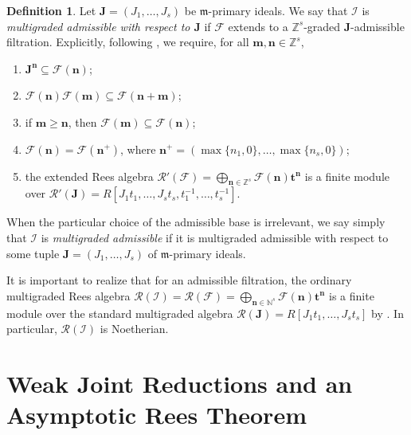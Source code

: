 \documentclass[reqno,12pt]{amsart}
\theoremstyle{plain}
\theoremstyle{definition}
\newtheorem{defn}[prop]{Definition}
\theoremstyle{remark}
\newcommand{\N}{\mathbb N}
\newcommand{\Z}{\mathbb Z}
\numberwithin{equation}{section}
\begin{document}
\begin{defn}
\label{def:admissible}
Let $\mathbf J=(J_1,\ldots,J_s)$ be $\mathfrak m$-primary ideals. We
say that $\boldsymbol{\mathcal I}$ is \emph{multigraded admissible with
respect to $\mathbf J$} if $\mathcal F$ extends to a
$\Z^s$-graded $\mathbf J$-admissible filtration. Explicitly, following
\cite[Definitions~1.3 and 1.4]{SarkarVerma}, we require, for all
$\mathbf m,\mathbf n\in\Z^s$,
\begin{enumerate}
\item $\mathbf J^{\mathbf n}\subseteq\mathcal F(\mathbf n)$;
\item $\mathcal F(\mathbf n)\mathcal F(\mathbf m)
      \subseteq\mathcal F(\mathbf n+\mathbf m)$;
\item if $\mathbf m\geq\mathbf n$, then
      $\mathcal F(\mathbf m)\subseteq\mathcal F(\mathbf n)$;
\item $\mathcal F(\mathbf n)=\mathcal F(\mathbf n^+)$, where
      $\mathbf n^+=(\max\{n_1,0\},\ldots,\max\{n_s,0\})$;
\item the extended Rees algebra $\mathcal R'(\mathcal F)
=
\bigoplus_{\mathbf n\in\Z^s}\mathcal F(\mathbf n)\mathbf t^{\mathbf n}$
is a finite module over
$\mathcal R'(\mathbf J)
=R[J_1t_1,\ldots,J_st_s,t_1^{-1},\ldots,t_s^{-1}]$.
\end{enumerate}
When the particular choice of the admissible base is irrelevant, we say
simply that $\boldsymbol{\mathcal I}$ is \emph{multigraded admissible}
if it is multigraded admissible with respect to some tuple
$\mathbf J=(J_1,\ldots,J_s)$ of $\mathfrak m$-primary ideals.
\end{defn}

It is important to realize that for an admissible filtration, the ordinary multigraded Rees algebra $\mathcal R(\boldsymbol{\mathcal I})
=
\mathcal R(\mathcal F)
=
\bigoplus_{\mathbf n\in\N^s}
\mathcal F(\mathbf n)\mathbf t^{\mathbf n}$
is a finite module over the standard multigraded algebra
$\mathcal R(\mathbf J)=R[J_1t_1,\ldots,J_st_s]$ by
\cite[Proposition~2.5]{MasutiSarkarVerma}. In particular,
$\mathcal R(\boldsymbol{\mathcal I})$ is Noetherian.

\section{Weak Joint Reductions and an Asymptotic Rees Theorem}
\label{sec:weak}
\end{document}
